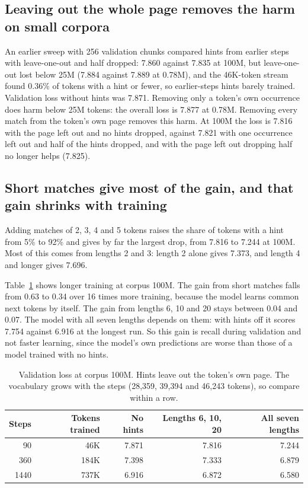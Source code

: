 \documentclass[11pt]{article}
\begin{document}
\subsection{Leaving out the whole page removes the harm on small corpora}
An earlier sweep with 256 validation chunks compared hints from earlier steps with leave-one-out and half dropped: 7.860 against 7.835 at 100M, but leave-one-out lost below 25M (7.884 against 7.889 at 0.78M), and the 46K-token stream found 0.36\% of tokens with a hint or fewer, so earlier-steps hints barely trained. Validation loss without hints was 7.871. Removing only a token's own occurrence does harm below 25M tokens: the overall loss is 7.877 at 0.78M. Removing every match from the token's own page removes this harm. At 100M the loss is 7.816 with the page left out and no hints dropped, against 7.821 with one occurrence left out and half of the hints dropped, and with the page left out dropping half no longer helps (7.825).

\subsection{Short matches give most of the gain, and that gain shrinks with training}
Adding matches of 2, 3, 4 and 5 tokens raises the share of tokens with a hint from 5\% to 92\% and gives by far the largest drop, from 7.816 to 7.244 at 100M. Most of this comes from lengths 2 and 3: length 2 alone gives 7.373, and length 4 and longer gives 7.696.

Table~\ref{tab:long} shows longer training at corpus 100M. The gain from short matches falls from 0.63 to 0.34 over 16 times more training, because the model learns common next tokens by itself. The gain from lengths 6, 10 and 20 stays between 0.04 and 0.07. The model with all seven lengths depends on them: with hints off it scores 7.754 against 6.916 at the longest run. So this gain is recall during validation and not faster learning, since the model's own predictions are worse than those of a model trained with no hints.

\begin{table}[h]\centering\small
\begin{tabular}{rrrrr}\toprule
Steps & Tokens trained & No hints & Lengths 6, 10, 20 & All seven lengths\\\midrule
90 & 46K & 7.871 & 7.816 & 7.244\\
360 & 184K & 7.398 & 7.333 & 6.879\\
1440 & 737K & 6.916 & 6.872 & 6.580\\\bottomrule
\end{tabular}
\caption{Validation loss at corpus 100M. Hints leave out the token's own page. The vocabulary grows with the steps (28,359, 39,394 and 46,243 tokens), so compare within a row.}\label{tab:long}
\end{table}
\end{document}
